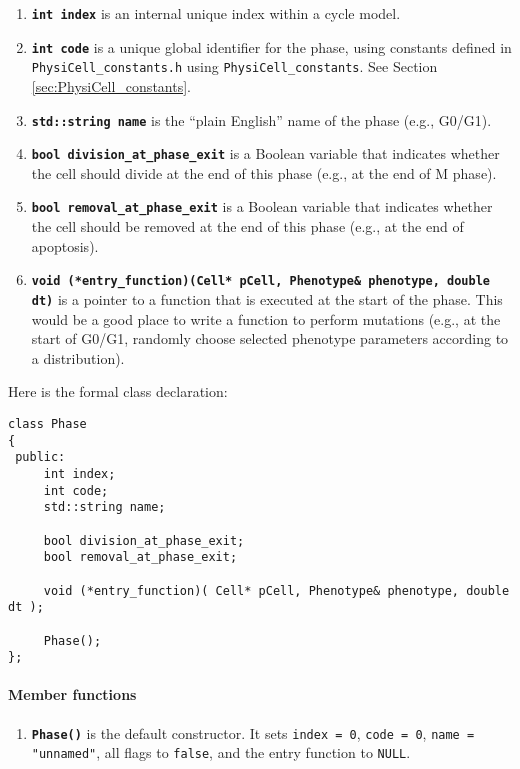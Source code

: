 \documentclass[12pt]{article}
\renewcommand{\v}{\verb}
\newcommand{\smallcode}[1]{\textbf{\texttt{#1}}}
\begin{document}
\begin{enumerate}
\item
\smallcode{int index} is an internal unique index within a cycle model. 

\item
\smallcode{int code} is a unique global identifier for the phase, using constants defined in \hfill\break
\v|PhysiCell_constants.h| using \v|PhysiCell_constants|. 
See Section \ref{sec:PhysiCell_constants}.

\item 
\smallcode{std::string name} is the ``plain English'' name of the phase (e.g., G0/G1). 

\item 
\smallcode{bool division\_at\_phase\_exit} is a Boolean variable that indicates whether the cell 
should divide at the end of this phase (e.g., at the end of M phase). 

\item 
\smallcode{bool removal\_at\_phase\_exit} is a Boolean variable that indicates whether the cell 
should be removed at the end of this phase (e.g., at the end of apoptosis). 

\item 
\smallcode{void (*entry\_function)(Cell* pCell, Phenotype\& phenotype, double dt)} is a 
pointer to a function that is 
executed at the start of the phase. This would be a good place to write a function to 
perform mutations (e.g., at the start of G0/G1, randomly choose selected phenotype 
parameters according to a distribution). 
\end{enumerate}

Here is the formal class declaration:
\begin{verbatim}
class Phase
{
 public:
     int index;
     int code; 
     std::string name; 
     
     bool division_at_phase_exit; 
     bool removal_at_phase_exit; 
     
     void (*entry_function)( Cell* pCell, Phenotype& phenotype, double dt ); 
     
     Phase();
};
\end{verbatim}

\paragraph{Member functions}
\begin{enumerate}
\item
\smallcode{Phase()} is the default constructor. It sets \v|index = 0|, 
\v|code = 0|, \v|name = "unnamed"|, all flags to \v|false|, and 
the entry function to \v|NULL|. 
\end{enumerate}
\end{document}
